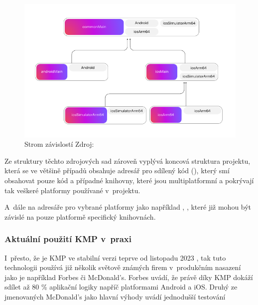 
\begin{figure}[H]
  \centering
  \includegraphics[width=.9\textwidth]{dependson-tree-diagram.png}
  \caption{Strom závislostí Zdroj: \cite{imgStromZavislosti}}
  \label{fig:dependson-tree-diagram}
\end{figure}

Ze struktury těchto zdrojových sad zároveň vyplývá koncová struktura projektu, která se ve většině případů obsahuje adresář pro sdílený kód (), 
který smí obsahovat pouze kód a případné knihovny, které jsou multiplatformní a pokrývají tak veškeré platformy používané v~projektu.

A~dále na adresáře pro vybrané platformy jako například , , které již mohou být závislé na pouze platformě specifický knihovnách.

\subsubsection*{Aktuální použití KMP v~praxi} \label{kmpInPractise}

I~přesto, že je KMP ve stabilní verzi teprve od listopadu 2023 \cite{KMPstable}, tak tuto technologii používá již několik světově 
známých firem v~produkčním nasazení jako je například Forbes či McDonald's. Forbes uvádí, že právě díky KMP dokáží sdílet až 80 \%
aplikační logiky napříč platformami Android a iOS. \cite{KMPinForbes} 
Druhý ze jmenovaných McDonald's jako hlavní výhody uvádí jednodušší testování \cite{KMPinMcDonalds}

